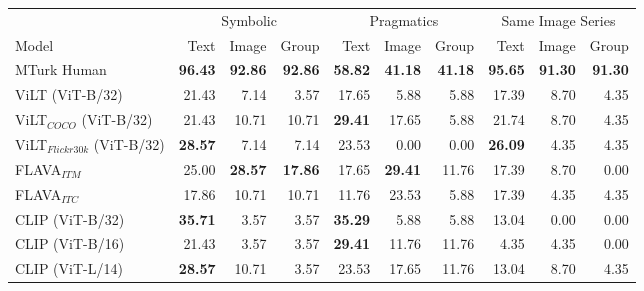 \begin{table*}
    \centering
   \begin{adjustbox}{max width=\textwidth}
  \begin{tabular}{l|rrr|rrr|rrr}
    \toprule
     &
      \multicolumn{3}{c|}{Symbolic} &
      \multicolumn{3}{c|}{Pragmatics} &
      \multicolumn{3}{c}{Same Image Series} \\
    Model & Text & Image & Group & Text & Image & Group & Text & Image & Group \\\midrule
 MTurk Human                  & \textbf{96.43} & \textbf{92.86} & \textbf{92.86} & \textbf{58.82} & \textbf{41.18} & \textbf{41.18} & \textbf{95.65} & \textbf{91.30} & \textbf{91.30} \\
 ViLT (ViT-B/32)                     & 21.43          & 7.14           & 3.57           & 17.65          & 5.88           & 5.88           & 17.39          & 8.70           & 4.35           \\
 ViLT$_{COCO}$ (ViT-B/32)            & 21.43          & 10.71          & 10.71          & \textbf{29.41} & 17.65          & 5.88           & 21.74          & 8.70           & 4.35           \\
 ViLT$_{Flickr30k}$ (ViT-B/32)       & \textbf{28.57} & 7.14           & 7.14           & 23.53          & 0.00           & 0.00           & \textbf{26.09} & 4.35           & 4.35           \\
 FLAVA$_{ITM}$                       & 25.00          & \textbf{28.57} & \textbf{17.86} & 17.65          & \textbf{29.41} & 11.76          & 17.39          & 8.70           & 0.00           \\
 FLAVA$_{ITC}$                       & 17.86          & 10.71          & 10.71          & 11.76          & 23.53          & 5.88           & 17.39          & 4.35           & 4.35           \\
 CLIP (ViT-B/32)                     & \textbf{35.71} & 3.57           & 3.57           & \textbf{35.29} & 5.88           & 5.88           & 13.04          & 0.00           & 0.00           \\
 CLIP (ViT-B/16)                     & 21.43          & 3.57           & 3.57           & \textbf{29.41} & 11.76          & 11.76          & 4.35           & 4.35           & 0.00           \\
 CLIP (ViT-L/14)                     & \textbf{28.57} & 10.71          & 3.57           & 23.53          & 17.65          & 11.76          & 13.04          & 8.70           & 4.35           \\

\end{tabular}
\end{adjustbox}
\end{table*}
